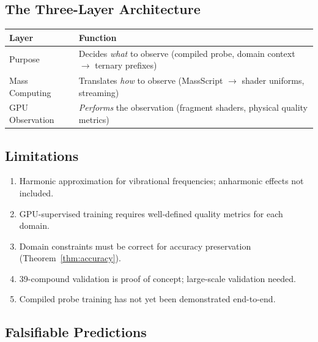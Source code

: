 \documentclass[11pt,twocolumn,a4paper]{article}
\theoremstyle{definition}
\theoremstyle{remark}
\begin{document}
\subsection{The Three-Layer Architecture}

\begin{center}
\small
\begin{tabular}{lp{5.5cm}}
\toprule
\textbf{Layer} & \textbf{Function} \\
\midrule
Purpose & Decides \emph{what} to observe (compiled probe, domain context $\to$ ternary prefixes) \\
Mass Computing & Translates \emph{how} to observe (MassScript $\to$ shader uniforms, streaming) \\
GPU Observation & \emph{Performs} the observation (fragment shaders, physical quality metrics) \\
\bottomrule
\end{tabular}
\end{center}

\subsection{Limitations}

\begin{enumerate}[nosep]
\item Harmonic approximation for vibrational frequencies; anharmonic effects not included.
\item GPU-supervised training requires well-defined quality metrics for each domain.
\item Domain constraints must be correct for accuracy preservation (Theorem~\ref{thm:accuracy}).
\item 39-compound validation is proof of concept; large-scale validation needed.
\item Compiled probe training has not yet been demonstrated end-to-end.
\end{enumerate}

\subsection{Falsifiable Predictions}
\end{document}
